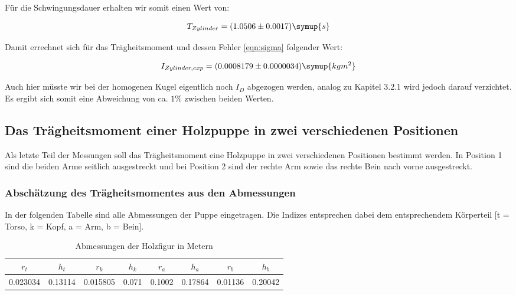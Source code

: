 Für die Schwingungsdauer erhalten wir somit einen Wert von:

\begin{equation}
  T_{Zylinder} = (1.0506 \pm 0.0017) \symup{s}
\end{equation}

Damit errechnet sich für das Trägheitsmoment und dessen Fehler \eqref{eqn:sigma} folgender Wert:

\begin{equation}
  I_{Zylinder,exp} = (0.0008179 \pm 0.0000034)  \symup{kg m^2}
\end{equation}

Auch hier müsste wir bei der homogenen Kugel eigentlich noch $I_D$ abgezogen werden,
analog zu Kapitel 3.2.1 wird jedoch darauf verzichtet. Es ergibt sich somit eine
Abweichung von ca. $1 \%$ zwischen beiden Werten.

\newpage

\subsection{Das Trägheitsmoment einer Holzpuppe in zwei verschiedenen Positionen}

Als letzte Teil der Messungen soll das Trägheitsmoment eine Holzpuppe in zwei verschiedenen
Positionen bestimmt werden. In Position 1 sind die beiden Arme seitlich ausgestreckt und
bei Position 2 sind der rechte Arm sowie das rechte Bein nach vorne ausgestreckt.


\subsubsection{Abschätzung des Trägheitsmomentes aus den Abmessungen}
In der folgenden Tabelle sind alle Abmessungen der Puppe eingetragen. Die Indizes entsprechen
dabei dem entsprechendem Körperteil [t = Torso, k = Kopf, a = Arm, b = Bein].

\begin{table}
  \centering
  \caption{Abmessungen der Holzfigur in Metern}
  \begin{tabular}{c c c c c c c c}
    \toprule $r_t$ & $h_t$ & $r_k$ & $h_k$ & $r_a$ & $h_a$ & $r_b$ & $h_b$ \\
    \midrule 0.023034 & 0.13114 & 0.015805 & 0.071 & 0.1002 & 0.17864 & 0.01136 & 0.20042 \\
    \bottomrule
  \end{tabular}
\end{table}

